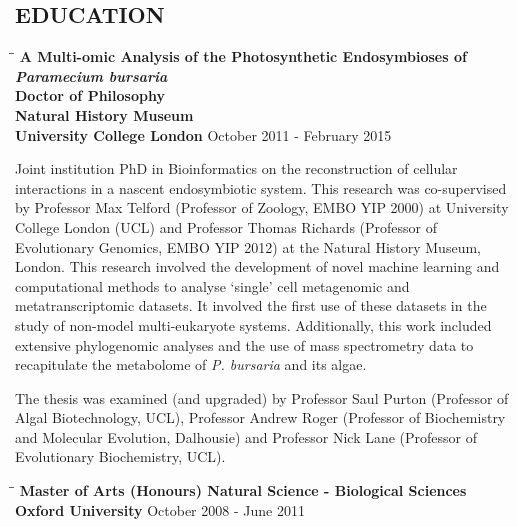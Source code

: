 \documentclass{res}
\begin{document}
\begin{resume}
        
\section{EDUCATION}          

\vspace{-0.05in}
\begin{tabbing}
   \hspace{2in}\= \hspace{2.6in}\= \kill 
   {\bf A Multi-omic Analysis of the Photosynthetic Endosymbioses of \textit{Paramecium bursaria}}\\
    {\bf Doctor of Philosophy}\\ 
    {\bf Natural History Museum}\\
    {\bf University College London
    } \>      \>October 2011 - February 2015\\

   \end{tabbing}\vspace{-20pt}  
   
   Joint institution PhD in Bioinformatics on the reconstruction of cellular interactions in a nascent endosymbiotic system.  This research was co-supervised by Professor Max Telford (Professor of Zoology, EMBO YIP 2000) at University College London (UCL) and Professor Thomas Richards (Professor of Evolutionary Genomics, EMBO YIP 2012) at the Natural History Museum, London.  
   This research involved the development of novel machine learning and computational methods
   to analyse `single' cell metagenomic and metatranscriptomic datasets.  
   It involved the first use of these datasets in the study of non-model multi-eukaryote systems.
   Additionally, this work included extensive phylogenomic analyses and the use of 
   mass spectrometry data
   to recapitulate the metabolome of \textit{P. bursaria} and its algae. 

   The thesis was examined (and upgraded) by 
   Professor Saul Purton (Professor of Algal Biotechnology, UCL), Professor Andrew Roger (Professor of Biochemistry and Molecular Evolution, Dalhousie) and Professor Nick Lane (Professor of Evolutionary Biochemistry, UCL).

\vspace{-0.1in}
 \begin{tabbing}
   \hspace{2in}\= \hspace{2.6in}\= \kill 
     {\bf Master of Arts (Honours) Natural Science - Biological Sciences}\\
    {\bf Oxford University
    } \>      \>October 2008 - June 2011\\
                          


\end{tabbing}
\end{resume}
\end{document}
